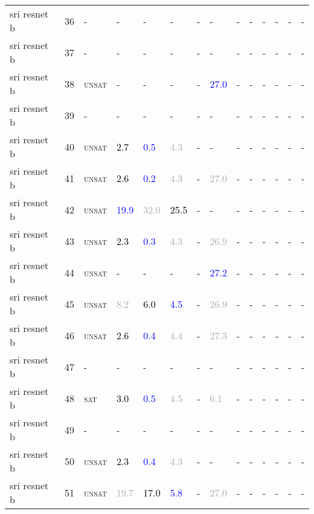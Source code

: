 \begin{center}
{\begin{longtable}{@{}llllllllllllll@{}}
sri resnet b & 36 & - & - & - & - & - & - & - & - & - & - & - & - \\
sri resnet b & 37 & - & - & - & - & - & - & - & - & - & - & - & - \\
sri resnet b & 38 & \textsc{unsat} & - & - & - & - & \textcolor{blue}{27.0} & - & - & - & - & - & - \\
sri resnet b & 39 & - & - & - & - & - & - & - & - & - & - & - & - \\
sri resnet b & 40 & \textsc{unsat} & \textcolor{black}{2.7} & \textcolor{blue}{0.5} & \textcolor{darkgray}{4.3} & - & - & - & - & - & - & - & - \\
sri resnet b & 41 & \textsc{unsat} & \textcolor{black}{2.6} & \textcolor{blue}{0.2} & \textcolor{darkgray}{4.3} & - & \textcolor{darkgray}{27.0} & - & - & - & - & - & - \\
sri resnet b & 42 & \textsc{unsat} & \textcolor{blue}{19.9} & \textcolor{darkgray}{32.0} & \textcolor{black}{25.5} & - & - & - & - & - & - & - & - \\
sri resnet b & 43 & \textsc{unsat} & \textcolor{black}{2.3} & \textcolor{blue}{0.3} & \textcolor{darkgray}{4.3} & - & \textcolor{darkgray}{26.9} & - & - & - & - & - & - \\
sri resnet b & 44 & \textsc{unsat} & - & - & - & - & \textcolor{blue}{27.2} & - & - & - & - & - & - \\
sri resnet b & 45 & \textsc{unsat} & \textcolor{darkgray}{8.2} & \textcolor{black}{6.0} & \textcolor{blue}{4.5} & - & \textcolor{darkgray}{26.9} & - & - & - & - & - & - \\
sri resnet b & 46 & \textsc{unsat} & \textcolor{black}{2.6} & \textcolor{blue}{0.4} & \textcolor{darkgray}{4.4} & - & \textcolor{darkgray}{27.3} & - & - & - & - & - & - \\
sri resnet b & 47 & - & - & - & - & - & - & - & - & - & - & - & - \\
sri resnet b & 48 & \textsc{sat} & \textcolor{black}{3.0} & \textcolor{blue}{0.5} & \textcolor{darkgray}{4.5} & - & \textcolor{darkgray}{6.1} & - & - & - & - & - & - \\
sri resnet b & 49 & - & - & - & - & - & - & - & - & - & - & - & - \\
sri resnet b & 50 & \textsc{unsat} & \textcolor{black}{2.3} & \textcolor{blue}{0.4} & \textcolor{darkgray}{4.3} & - & - & - & - & - & - & - & - \\
sri resnet b & 51 & \textsc{unsat} & \textcolor{darkgray}{19.7} & \textcolor{black}{17.0} & \textcolor{blue}{5.8} & - & \textcolor{darkgray}{27.0} & - & - & - & - & - & - \\

\end{longtable}}
\end{center}
